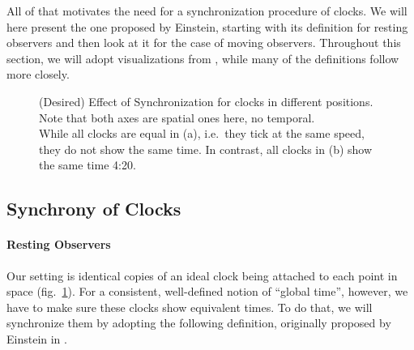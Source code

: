 All of that motivates the need for a synchronization procedure of clocks. We will here present the one proposed by Einstein, starting with its definition for resting observers and then look at it for the case of moving observers. Throughout this section, we will adopt visualizations from \cite{dragon_geometry_srt}, while many of the definitions follow \cite{giulini_srt} more closely.



\begin{figure}
	\centering
	
	\hspace*{0.1\textwidth}
	
	\caption[Effect of Synchronization]{(Desired) Effect of Synchronization for clocks in different positions. Note that both axes are spatial ones here, no temporal.\\
	While all clocks are equal in (a), i.e.~they tick at the same speed, they do not show the same time. In contrast, all clocks in (b) show the same time 4:20.}
	\label{fig:unsynchr_synchr_clocks}
\end{figure}



		\subsection{Synchrony of Clocks}
			\paragraph{Resting Observers}
Our setting is identical copies of an ideal clock being attached to each point in space (fig.~\ref{fig:unsynchr_synchr_clocks}). For a consistent, well-defined notion of \enquote{global time}, however, we have to make sure these clocks show equivalent times. To do that, we will synchronize them by adopting the following definition, originally proposed by Einstein in \cite{Einstein_1905}.

